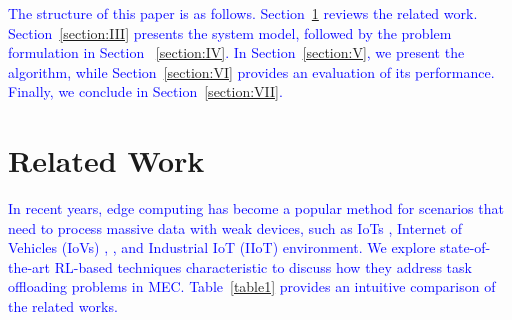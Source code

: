 \documentclass[12pt,draftclsnofoot,onecolumn]{IEEEtran}
\begin{document}
\textcolor{blue}{The structure of this paper is as follows. Section~\ref{section:II} reviews the related work. Section~\ref{section:III} presents the system model, followed by the problem formulation in Section ~\ref{section:IV}. In Section~\ref{section:V}, we present the algorithm, while Section~\ref{section:VI} provides an evaluation of its performance. Finally, we conclude in Section~\ref{section:VII}.}


\section{Related Work}
\label{section:II}
	
	
	
	
	
	
	
	
	\textcolor{blue}{In recent years, edge computing has become a popular method for scenarios that need to process massive data with weak devices, such as IoTs \cite{zhang2023multi}, Internet of Vehicles (IoVs) \cite{lin2022multi}, \cite{wei2023many}, and Industrial IoT (IIoT) \cite{yuan2023adaptive} environment.
		We explore state-of-the-art RL-based techniques characteristic to discuss how they address task offloading problems in MEC. Table~\ref{table1} provides an intuitive comparison of the related works.}
	
\end{document}
